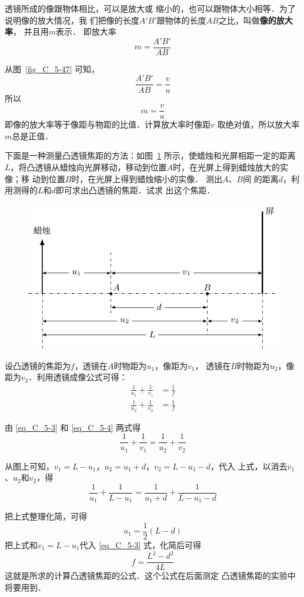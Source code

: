 透镜所成的像跟物体相比，可以是放大或
缩小的，也可以跟物体大小相等．为了说明像的放大情况，我
们把像的长度$A'B'$跟物体的长度$AB$之比，叫做\textbf{像的放大率}，
并且用$m$表示．
即放大率
\[m=\frac{A'B'}{AB} \]

从图~\ref{fig_C_5-47} 可知，
\[\frac{A'B'}{AB}=\frac{v}{u} \]
所以
\[m=\frac{v}{u}\]
即像的放大率等于像距与物距的比值．计算放大率时像距$v$
取绝对值，所以放大率$m$总是正值．

\begin{example}
    下面是一种测量凸透镜焦距的方法：如图~\ref{fig_C_5-48} 
所示，使蜡烛和光屏相距一定的距离$L$，将凸透镜从蜡烛向光屏移动，移动到位置$A$时，在光屏上得到蜡烛放大的实像；移
动到位置$B$时，在光屏上得到蜡烛缩小的实像．
测出$A$、$B$间
的距离$d$，利用测得的$L$和$d$即可求出凸透镜的焦距．试求
出这个焦距．
\end{example}

\begin{figure}[htbp]
    \centering
    \includegraphics{fig/C/5-48.pdf}
    \caption{}\label{fig_C_5-48}
\end{figure}

\begin{solution}
    设凸透镜的焦距为$f$，透镜在$A$时物距为$u_1$，像距为$v_1$，
    透镜在$B$时物距为$u_2$，像距为$v_2$．利用透镜成像公式可得：
   \begin{align}
\frac{1}{u_1}+\frac{1}{v_1}&=\frac{1}{f} \label{eq_C_5-3} \\
\frac{1}{u_2}+\frac{1}{v_2}&=\frac{1}{f} \label{eq_C_5-4}
   \end{align}
 
    由 \eqref{eq_C_5-3} 和 \eqref{eq_C_5-4} 两式得
\[\frac{1}{u_1}+\frac{1}{v_1}=\frac{1}{u_2}+\frac{1}{v_2} \]
    
从图上可知，$v_1=L-u_1$，$u_2=u_1+d$，$v_2=L-u_1-d$，代入
    上式，以消去$v_1$、$u_2$和$v_2$，得
    \[\frac{1}{u_1}+\frac{1}{L-u_1}=\frac{1}{u_1+d}+\frac{1}{L-u_1-d} \]

    把上式整理化简，可得
\[u_1=\frac{1}{2}(L-d) \]
    把上式和$v_1=L-u_1$代入 \eqref{eq_C_5-3} 式，化简后可得
\[f=\frac{L^2-d^2}{4L} \]
    这就是所求的计算凸透镜焦距的公式．这个公式在后面测定
    凸透镜焦距的实验中将要用到．
\end{solution}

